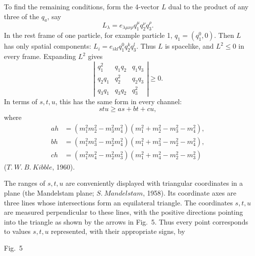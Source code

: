 To find the remaining conditions, form the 4-vector $L$ dual to the product of any three of the $q_a$, say
\begin{equation}
L_\lambda=e_{\lambda\mu\nu\rho}q_1^\mu q_2^\nu q_3^\rho.
\tag{67.3}
\end{equation}
In the rest frame of one particle, for example particle 1, $q_1=(q_1^0,0)$. Then $L$ has only spatial components: $L_i=e_{ikl}q_1^0q_2^kq_3^l$. Thus $L$ is spacelike, and $L^2\leqslant0$ in every frame. Expanding $L^2$ gives
\begin{equation}
\left|\begin{matrix}q_1^2&q_1q_2&q_1q_3\\q_2q_1&q_2^2&q_2q_3\\q_3q_1&q_3q_2&q_3^2\end{matrix}\right|\geqslant0.
\tag{67.4}
\end{equation}
In terms of $s,t,u$, this has the same form in every channel:
\begin{equation}
stu\geqslant as+bt+cu,
\tag{67.5}
\end{equation}
where
\begin{equation}
\begin{aligned}
ah&=(m_1^2m_2^2-m_3^2m_4^2)(m_1^2+m_2^2-m_3^2-m_4^2),\\
bh&=(m_1^2m_3^2-m_2^2m_4^2)(m_1^2+m_3^2-m_2^2-m_4^2),\\
ch&=(m_1^2m_4^2-m_2^2m_3^2)(m_1^2+m_4^2-m_2^2-m_3^2)
\end{aligned}
\tag{67.6}
\end{equation}
($T.~W.~B.~Kibble$, 1960).

The ranges of $s,t,u$ are conveniently displayed with triangular coordinates in a plane (the Mandelstam plane; $S.~Mandelstam$, 1958). Its coordinate axes are three lines whose intersections form an equilateral triangle. The coordinates $s,t,u$ are measured perpendicular to these lines, with the positive directions pointing into the triangle as shown by the arrows in Fig.~5. Thus every point corresponds to values $s,t,u$ represented, with their appropriate signs, by
\begin{center}

Fig.~5
\end{center}

